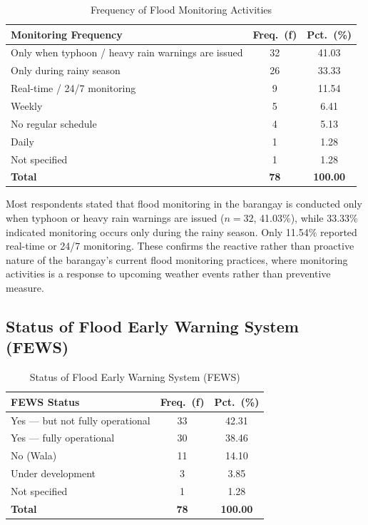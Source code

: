 \documentclass{research}
\begin{document}
\begin{table}[htbp]
\centering
\small
\caption{Frequency of Flood Monitoring Activities}
\label{tab:freq}
\begin{tabular}{p{9.5cm}|c|c}
\hline
\textbf{Monitoring Frequency} & \textbf{Freq.\ (f)} & \textbf{Pct.\ (\%)} \\
\hline
Only when typhoon / heavy rain warnings are issued & 32 & 41.03 \\
Only during rainy season                           & 26 & 33.33 \\
Real-time / 24/7 monitoring                        &  9 & 11.54 \\
Weekly                                             &  5 &  6.41 \\
No regular schedule                                &  4 &  5.13 \\
Daily                                              &  1 &  1.28 \\
Not specified                                      &  1 &  1.28 \\
\hline
\textbf{Total}                                     & \textbf{78} & \textbf{100.00} \\
\hline
\end{tabular}
\end{table}
 
Most respondents stated that flood monitoring in the
barangay is conducted only when typhoon or heavy rain warnings are issued ($n=32$,
41.03\%), while 33.33\% indicated monitoring occurs only during the rainy season. Only
11.54\% reported real-time or 24/7 monitoring. These confirms the reactive rather
than proactive nature of the barangay's current flood monitoring practices, where
monitoring activities is a response to upcoming weather events rather
than preventive measure.
 
\subsection{Status of Flood Early Warning System (FEWS)}
 
\begin{table}[htbp]
\centering
\small
\caption{Status of Flood Early Warning System (FEWS)}
\label{tab:fews}
\begin{tabular}{p{9.5cm}|c|c}
\hline
\textbf{FEWS Status} & \textbf{Freq.\ (f)} & \textbf{Pct.\ (\%)} \\
\hline
Yes --- but not fully operational & 33 & 42.31 \\
Yes --- fully operational          & 30 & 38.46 \\
No (Wala)                          & 11 & 14.10 \\
Under development                  &  3 &  3.85 \\
Not specified                      &  1 &  1.28 \\
\hline
\textbf{Total}                     & \textbf{78} & \textbf{100.00} \\
\hline
\end{tabular}
\end{table}
 
\end{document}
